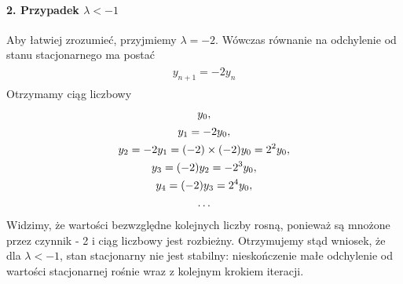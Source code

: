 \documentclass[a4paper,12pt,polish]{sphinxmanual}
\begin{document}
\paragraph{2. Przypadek $\lambda < -1$}
\label{ch1/chI031:id1}
Aby łatwiej zrozumieć, przyjmiemy  $\lambda = - 2$. Wówczas równanie na odchylenie od stanu stacjonarnego ma postać
\label{ch1/chI031:equation-eqn22}\begin{gather}
\begin{split}y_{n+1} = - 2 y_n\end{split}\label{ch1/chI031-eqn22}
\end{gather}
Otrzymamy ciąg liczbowy
\label{ch1/chI031:equation-eqn23}\begin{gather}
\begin{split} y_0,\end{split}\label{ch1/chI031-eqn23}\\\begin{split} y_1 = - 2 y_0,\end{split}\notag\\\begin{split} y_2 = - 2 y_1 = (- 2)  \times (- 2) y_0 = 2^2 y_0,\end{split}\notag\\\begin{split} y_3 = (- 2) y_2 =  - 2^3 y_0,\end{split}\notag\\\begin{split} y_4 = (- 2) y_3 = 2^4 y_0,\end{split}\notag\\\begin{split} \dots\end{split}\notag
\end{gather}
Widzimy, że  wartości bezwzględne kolejnych liczby rosną, ponieważ są mnożone przez czynnik - 2 i ciąg liczbowy jest rozbieżny. Otrzymujemy stąd wniosek, że dla $\lambda < - 1$, stan stacjonarny nie jest stabilny: nieskończenie małe odchylenie od wartości stacjonarnej rośnie wraz z kolejnym krokiem iteracji.
\end{document}

